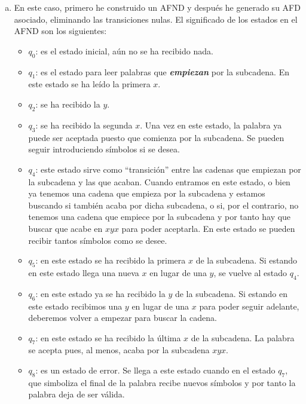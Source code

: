 \documentclass[11pt,a4paper]{article}
\begin{document}
\begin{enumerate}[a)]
\begin{figure}[H]
		\end{figure}
		\item En este caso, primero he construido un AFND y después he generado su AFD asociado, eliminando las transiciones nulas. El significado de los estados en el AFND son los siguientes:
		\begin{itemize}
			\item $q_0$: es el estado inicial, aún no se ha recibido nada.
			\item $q_1$: es el estado para leer palabras que \textbf{\textit{empiezan}} por la subcadena. En este estado se ha leído la primera $x$.
			\item $q_2$: se ha recibido la $y$.
			\item $q_3$: se ha recibido la segunda $x$. Una vez en este estado, la palabra ya puede ser aceptada puesto que comienza por la subcadena. Se pueden seguir introduciendo símbolos si se desea.
			\item $q_4$: este estado sirve como ``transición'' entre las cadenas que empiezan por la subcadena y las que acaban. Cuando entramos en este estado, o bien ya tenemos una cadena que empieza por la subcadena y estamos buscando si también acaba por dicha subcadena, o si, por el contrario, no tenemos una cadena que empiece por la subcadena y por tanto hay que buscar que acabe en $xyx$ para poder aceptarla. En este estado se pueden recibir tantos símbolos como se desee.
			\item $q_5$: en este estado se ha recibido la primera $x$ de la subcadena. Si estando en este estado llega una nueva $x$ en lugar de una $y$, se vuelve al estado $q_4$.
			\item $q_6$: en este estado ya se ha recibido la $y$ de la subcadena. Si estando en este estado recibimos una $y$ en lugar de una $x$ para poder seguir adelante, deberemos volver a empezar para buscar la cadena.
			\item $q_7$: en este estado se ha recibido la última $x$ de la subcadena. La palabra se acepta pues, al menos, acaba por la subcadena $xyx$.
			\item $q_8$: es un estado de error. Se llega a este estado cuando en el estado $q_7$, que simboliza el final de la palabra recibe nuevos símbolos y por tanto la palabra deja de ser válida.

\end{itemize}
\end{enumerate}
\end{document}
